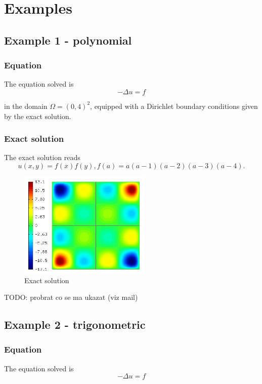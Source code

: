 \section{Examples}

	\subsection{Example 1 - polynomial}
		\subsubsection{Equation}
		The equation solved is
		\begin{equation}
			-\Delta u = f
		\end{equation}

		in the domain $\Omega = (0, 4)^2$, equipped with a Dirichlet
		boundary conditions given by the exact solution.

		\subsubsection{Exact solution}
		The exact solution reads
		\begin{equation}
			u(x, y) = f(x) f(y), f(a) = a\left(a-1\right)\left(a-2\right)\left(a-3\right)\left(a-4\right).
		\end{equation}
		\begin{figure}[H]
			\centering
			\includegraphics[height=5cm]{img/exact-polynom.png}
			\caption{Exact solution}
			\label{fig:exact-polynom}
		\end{figure}

		TODO: probrat co se ma ukazat (viz mail)



	\newpage
	\subsection{Example 2 - trigonometric}
		\subsubsection{Equation}
		The equation solved is
		\begin{equation}
			-\Delta u = f
		\end{equation}

